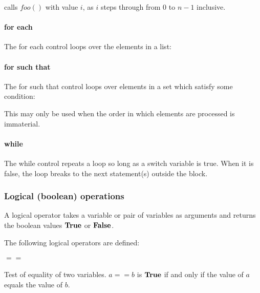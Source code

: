 calls $foo()$ with value $i$, as $i$ steps through from 0 to $n-1$ inclusive.


\paragraph*{for each} The for each control loops over the elements in
a list:

\begin{pseudo*}
\bsEND
\end{pseudo*}

\paragraph*{for such that} The for such that control loops over elements in
a set which satisfy some condition:

\begin{pseudo*}
\bsEND
\end{pseudo*}

This may only be used when the order in which elements are processed is 
immaterial.

\paragraph*{while}

The while control repeats a loop so long as a switch variable is true. 
When it is false, the loop breaks to the next statement(s) outside the block.

\begin{pseudo*}
\bsEND
{}
\end{pseudo*}

\subsubsection{Logical (boolean) operations}
\label{booleanops}

A logical operator takes a variable or pair of variables as arguments and
returns the boolean values $\text{\bf{True}}$ or $\text{\bf{False}}$.

The following logical operators are defined:

\paragraph*{$==$} Test of equality of two variables. $a==b$ is $\text{\bf{True}}$ if and
only if the value of $a$ equals the value of $b$. 

